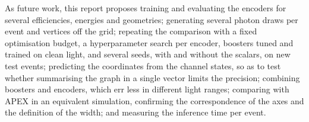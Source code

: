 { As future work, this report proposes training and evaluating the encoders for several efficiencies, energies and geometries; generating several photon draws per event and vertices off the grid; repeating the comparison with a fixed optimisation budget, a hyperparameter search per encoder, boosters tuned and trained on clean light, and several seeds, with and without the scalars, on new test events; predicting the coordinates from the channel states, so as to test whether summarising the graph in a single vector limits the precision; combining boosters and encoders, which err less in different light ranges; comparing with APEX in an equivalent simulation, confirming the correspondence of the axes and the definition of the width; and measuring the inference time per event.\par}

